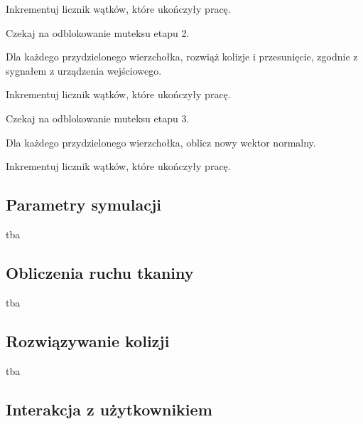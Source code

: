 \begin{algorithm}
{				Inkrementuj licznik wątków, które ukończyły pracę.
				
				Czekaj na odblokowanie muteksu etapu 2.
				
				Dla każdego przydzielonego wierzchołka, rozwiąż kolizje i przesunięcie, zgodnie z sygnałem z urządzenia wejściowego.
				
				Inkrementuj licznik wątków, które ukończyły pracę.
				
				Czekaj na odblokowanie muteksu etapu 3.
				
				Dla każdego przydzielonego wierzchołka, oblicz nowy wektor normalny.
				
				Inkrementuj licznik wątków, które ukończyły pracę.
			}
			
			\Indp
			
			\Indm
		\end{algorithm}
	
		\subsection{Parametry symulacji}
		\label{t:symulacja:dzialanie:parametry}
			
		
		tba
			
		\subsection{Obliczenia ruchu tkaniny}
		\label{t:symulacja:dzialanie:ruch}
			
		
		tba
		
		\subsection{Rozwiązywanie kolizji}
		\label{t:symulacja:dzialanie:kolizje}
			
		
		tba
			
		\subsection{Interakcja z użytkownikiem}
		\label{t:symulacja:dzialanie:interakcja}
			
